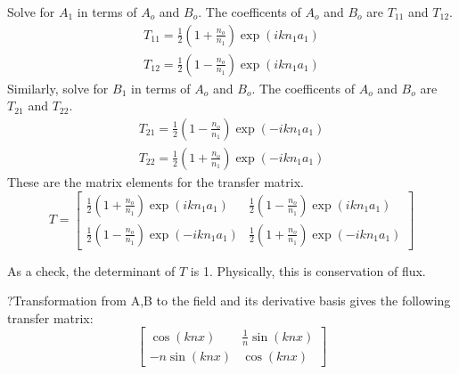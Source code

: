 Solve for $A_1$ in terms of $A_o$ and $B_o$. The coefficents of $A_o$ and $B_o$ are $T_{11}$ and $T_{12}$.
\begin{equation}
\begin{gathered}
T_{11} = \frac{1}{2} (1 + \frac{n_o}{n_1} ) \exp(i k n_1 a_1) \\
T_{12} = \frac{1}{2} (1 - \frac{n_o}{n_1} ) \exp(i k n_1 a_1)
\end{gathered}
\end{equation}
Similarly, solve for $B_1$ in terms of $A_o$ and $B_o$. The coefficents of $A_o$ and $B_o$ are $T_{21}$ and $T_{22}$.
\begin{equation}
\begin{gathered}
T_{21} = \frac{1}{2} (1 - \frac{n_o}{n_1} ) \exp(-i k n_1 a_1) \\
T_{22} = \frac{1}{2} (1 + \frac{n_o}{n_1} ) \exp(-i k n_1 a_1)
\end{gathered}
\end{equation}
These are the matrix elements for the transfer matrix.
\begin{equation}
T = \left[
\begin{array}{cc}
\frac{1}{2} (1 + \frac{n_o}{n_1} ) \exp(i k n_1 a_1) & \frac{1}{2} (1 - \frac{n_o}{n_1} ) \exp(i k n_1 a_1)\\
\frac{1}{2} (1 - \frac{n_o}{n_1} ) \exp(-i k n_1 a_1) & \frac{1}{2} (1 + \frac{n_o}{n_1} ) \exp(-i k n_1 a_1)
\end{array}
\right]
\end{equation}

As a check, the determinant of $T$ is 1. Physically, this is conservation of flux.

?Transformation from A,B to the field and its derivative basis gives the following transfer matrix:
\begin{equation}
\left[
\begin{array}{cc}
\cos(k n x) & \frac{1}{n}\sin(k n x) \\
-n \sin(k n x) & \cos(k n x)
\end{array}
\right]
\end{equation}